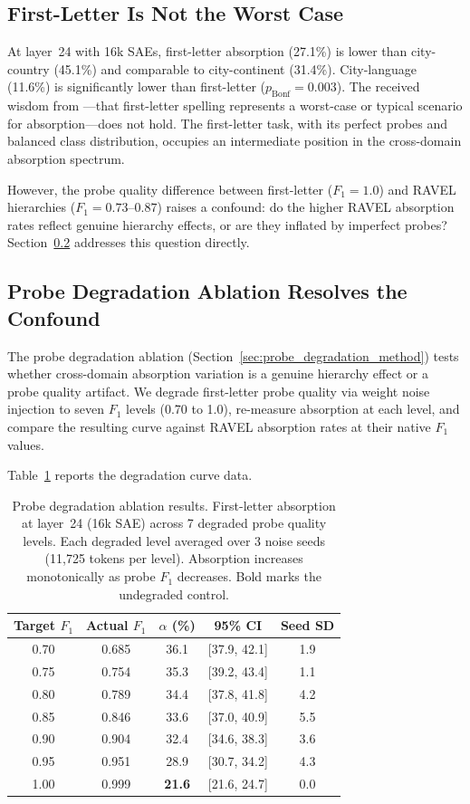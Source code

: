 \documentclass{article}
\begin{document}
\subsection{First-Letter Is Not the Worst Case}

At layer~24 with 16k SAEs, first-letter absorption (27.1\%) is lower than city-country (45.1\%) and comparable to city-continent (31.4\%). City-language (11.6\%) is significantly lower than first-letter ($p_{\text{Bonf}} = 0.003$). The received wisdom from \citet{chanin2024absorption}---that first-letter spelling represents a worst-case or typical scenario for absorption---does not hold. The first-letter task, with its perfect probes and balanced class distribution, occupies an intermediate position in the cross-domain absorption spectrum.

However, the probe quality difference between first-letter ($F_1 = 1.0$) and RAVEL hierarchies ($F_1 = 0.73$--$0.87$) raises a confound: do the higher RAVEL absorption rates reflect genuine hierarchy effects, or are they inflated by imperfect probes? Section~\ref{sec:probe_degradation} addresses this question directly.

\subsection{Probe Degradation Ablation Resolves the Confound}
\label{sec:probe_degradation}

The probe degradation ablation (Section~\ref{sec:probe_degradation_method}) tests whether cross-domain absorption variation is a genuine hierarchy effect or a probe quality artifact. We degrade first-letter probe quality via weight noise injection to seven $F_1$ levels (0.70 to 1.0), re-measure absorption at each level, and compare the resulting curve against RAVEL absorption rates at their native $F_1$ values.

Table~\ref{tab:degradation} reports the degradation curve data.

\begin{table}[t]
\caption{Probe degradation ablation results. First-letter absorption at layer~24 (16k SAE) across 7 degraded probe quality levels. Each degraded level averaged over 3 noise seeds (11,725 tokens per level). Absorption increases monotonically as probe $F_1$ decreases. Bold marks the undegraded control.}
\label{tab:degradation}
\centering
\begin{tabular}{ccccc}
\toprule
Target $F_1$ & Actual $F_1$ & $\alpha$ (\%) & 95\% CI & Seed SD \\
\midrule
0.70 & 0.685 & 36.1 & [37.9, 42.1] & 1.9 \\
0.75 & 0.754 & 35.3 & [39.2, 43.4] & 1.1 \\
0.80 & 0.789 & 34.4 & [37.8, 41.8] & 4.2 \\
0.85 & 0.846 & 33.6 & [37.0, 40.9] & 5.5 \\
0.90 & 0.904 & 32.4 & [34.6, 38.3] & 3.6 \\
0.95 & 0.951 & 28.9 & [30.7, 34.2] & 4.3 \\
1.00 & 0.999 & \textbf{21.6} & [21.6, 24.7] & 0.0 \\
\bottomrule
\end{tabular}
\end{table}
\end{document}
